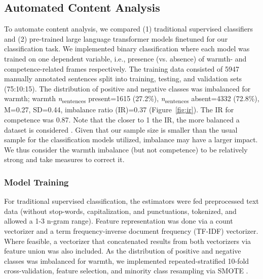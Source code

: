 \documentclass[man]{apa7}
\begin{document}
\subsection{Automated Content Analysis}
\label{autoca}
To automate content analysis, we compared (1) traditional supervised classifiers and (2) pre-trained large language transformer models finetuned for our classification task. We implemented binary classification where each model was trained on one dependent variable, i.e., presence (vs. absence) of warmth- and competence-related frames respectively. The training data consisted of 5947 manually annotated sentences split into training, testing, and validation sets (75:10:15). The distribution of positive and negative classes was imbalanced for warmth; warmth {\textit{n}\textsubscript{sentences}} present=1615 (27.2\%), {\textit{n}\textsubscript{sentences}} absent=4332 (72.8\%), M=0.27, SD=0.44, imbalance ratio (IR)=0.37 (Figure~\ref{fig:ir}). The IR for competence was 0.87. Note that the closer to 1 the IR, the more balanced a dataset is considered \parencite{zhu_adjusting_2020}. Given that our sample size is smaller than the usual sample for the classification models utilized, imbalance may have a larger impact. We thus consider the warmth imbalance (but not competence) to be relatively strong and take measures to correct it.

\subsubsection{Model Training}
\label{model_training}
For traditional supervised classification, the estimators were fed preprocessed text data (without stop-words, capitalization, and punctuations, tokenized, and allowed a 1-3 n-gram range). Feature representation was done via a count vectorizer and a term frequency-inverse document frequency (TF-IDF) vectorizer. Where feasible, a vectorizer that concatenated results from both vectorizers via feature union was also included. As the distribution of positive and negative classes was imbalanced for warmth, we implemented repeated-stratified 10-fold cross-validation, feature selection, and minority class resampling via SMOTE \parencite{aurelio_cost-sensitive_2022, chawla_smote_2002, sayyed2021StudySamplingMethods, thai-nghe_cost-sensitive_2010}.
\end{document}
